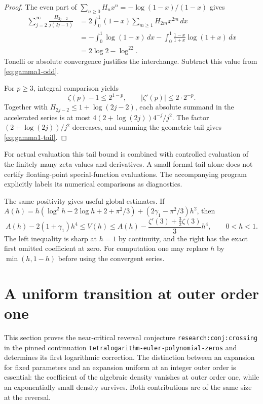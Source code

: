 \documentclass[11pt,a4paper]{article}
\numberwithin{equation}{section}
\theoremstyle{definition}
\theoremstyle{remark}
\begin{document}
\begin{proof}
The even part of $\sum_{n\geq0}H_nx^n=-\log(1-x)/(1-x)$ gives
\begin{align*}
 \sum_{j=2}^{\infty}\frac{H_{2j-2}}{j(2j-1)}
 &=2\int_0^1(1-x)\sum_{m\geq1}H_{2m}x^{2m}\,dx\\
 &=-\int_0^1\log(1-x)\,dx
     -\int_0^1\frac{1-x}{1+x}\log(1+x)\,dx\\
 &=2\log2-\log^22.
\end{align*}
Tonelli or absolute convergence justifies the interchange. Subtract
this value from \eqref{eq:gamma1-odd}.

For $p\geq3$, integral comparison yields
\[
 \zeta(p)-1\leq2^{1-p},\qquad
 |\zeta'(p)|\leq2\cdot2^{-p}.
\]
Together with $H_{2j-2}\leq1+\log(2j-2)$, each absolute summand
in the accelerated series is at most
$4(2+\log(2j))4^{-j}/j^2$. The factor
$(2+\log(2j))/j^2$ decreases, and summing the geometric tail gives
\eqref{eq:gamma1-tail}.
\end{proof}

For actual evaluation this tail bound is combined with controlled
evaluation of the finitely many zeta values and derivatives. A small
formal tail alone does not certify floating-point special-function
evaluations. The accompanying program explicitly labels its numerical
comparisons as diagnostics.

The same positivity gives useful global estimates. If
$A(h)=h(\log^2h-2\log h+2+\pi^2/3)
 +(2\gamma_1-\pi^2/3)h^2$, then
\begin{equation}\label{eq:V-bounds}
 A(h)-2(1+\gamma_1)h^4
 \leq V(h)\leq
 A(h)-\frac{\zeta'(3)+\tfrac32\zeta(3)}{3}h^4,
 \qquad 0<h<1.
\end{equation}
The left inequality is sharp at $h=1$ by continuity, and the right
has the exact first omitted coefficient at zero. For computation one
may replace $h$ by $\min(h,1-h)$ before using the convergent series.



\section{A uniform transition at outer order one}
\label{eutrans:sec:main}

This section proves the near-critical reversal conjecture
\texttt{research:conj:crossing} in the pinned continuation
\texttt{tetralogarithm-euler-polynomial-zeros} and determines its first
logarithmic correction. The distinction between an expansion for fixed
parameters and an expansion uniform at an integer outer order is essential:
the coefficient of the algebraic density vanishes at outer order one,
while an exponentially small density survives. Both contributions are
of the same size at the reversal.
\end{document}
